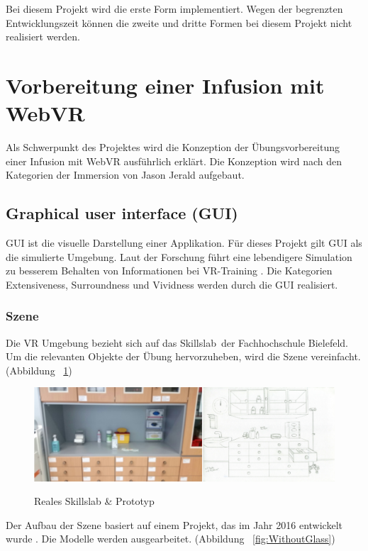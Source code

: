 Bei diesem Projekt wird die erste Form implementiert. Wegen der begrenzten Entwicklungszeit können die zweite und dritte Formen bei diesem Projekt nicht realisiert werden.

\section{Vorbereitung einer Infusion mit WebVR}

Als Schwerpunkt des Projektes wird die Konzeption der Übungsvorbereitung einer Infusion mit WebVR ausführlich erklärt. Die Konzeption wird nach den Kategorien der Immersion von Jason Jerald \citep{28} aufgebaut.

 \subsection{Graphical user interface (GUI)}
 GUI ist die visuelle Darstellung einer Applikation. Für dieses Projekt gilt GUI als die simulierte Umgebung. Laut der Forschung führt eine lebendigere Simulation zu besserem Behalten von Informationen bei VR-Training \citep{27}. Die Kategorien Extensiveness, Surroundness und Vividness werden durch die GUI realisiert.
 
  \subsubsection{Szene}
  Die VR Umgebung bezieht sich auf das \glqq Skillslab\grqq\ der Fachhochschule Bielefeld. Um die relevanten Objekte der Übung hervorzuheben, wird die Szene vereinfacht. (Abbildung ~\ref{fig:realToPrototype})
  
\begin{figure}[ht]
\vspace*{1em}
\centering
\caption{Reales Skillslab \& Prototyp}
\includegraphics[width=\textwidth]{images/realToPrototype.png}
\label{fig:realToPrototype} 
\end{figure}
  
  Der Aufbau der Szene basiert auf einem Projekt, das im Jahr 2016 entwickelt wurde \citep{26}. Die Modelle werden ausgearbeitet. (Abbildung ~\ref{fig:WithoutGlass})

